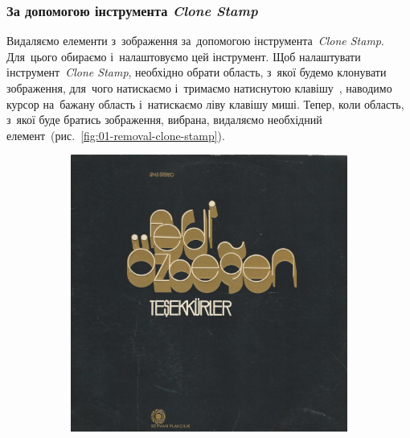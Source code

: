 \documentclass[
	a4paper,
	oneside,
	BCOR = 10mm,
	DIV = 12,
	12pt,
	headings = normal,
]{scrartcl}
\begin{document}
			\subsubsection{За допомогою інструмента \emph{\textenglish{Clone Stamp}}}
				Видаляємо елементи з~зображення за~допомогою інструмента~\emph{\textenglish{Clone Stamp}}. Для~цього обираємо і~налаштовуємо цей інструмент. Щоб налаштувати інструмент~\emph{\textenglish{Clone Stamp}}, необхідно обрати область, з~якої будемо клонувати зображення, для~чого натискаємо і~тримаємо натиснутою клавішу~, наводимо курсор на~бажану область і~натискаємо ліву клавішу миші. Тепер, коли область, з~якої буде братись зображення, вибрана, видаляємо необхідний елемент~(рис.~\ref{fig:01-removal-clone-stamp}).

				\begin{figure}[!htbp]
					\centering
					\begin{subfigure}{0.5\textwidth}
						\centering
						\includegraphics[height = 6\baselineskip]{./../01-solution/src.jpeg}
						\caption{}
						\label{subfig:01-01-src}
					\end{subfigure}%
					\begin{subfigure}{0.5\textwidth}
						\centering

\end{subfigure}
\end{figure}
\end{document}
